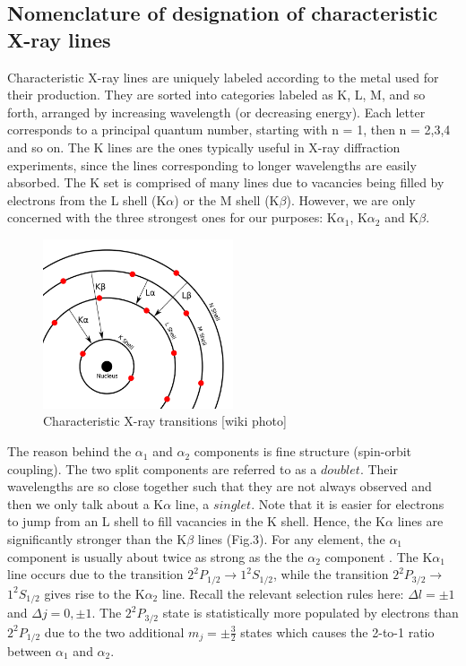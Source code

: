 \documentclass{article}
\begin{document}
\pagebreak{}

\subsection{Nomenclature of designation of characteristic X-ray lines}
Characteristic X-ray lines are uniquely labeled according to the metal used for their production. They are sorted into categories labeled as K, L, M, and so forth, arranged by increasing wavelength (or decreasing energy). Each letter corresponds to a principal quantum number, starting with n = 1, then n = 2,3,4 and so on. The K lines are the ones typically useful in X-ray diffraction experiments, since the lines corresponding to longer wavelengths are easily absorbed. The K set is comprised of many lines due to vacancies being filled by electrons from the L shell (K$\alpha$) or the M shell (K$\beta$). However, we are only concerned with the three strongest ones for our purposes: K$\alpha_1$, K$\alpha_2$ and K$\beta$. 

\begin{figure}[h]
    \centering
    \includegraphics[width=0.5\textwidth]{Figures/Screenshot 2024-06-02 204357.png}
    \caption{Characteristic X-ray transitions [wiki photo]}
    \label{fig:characteristicxraytransitions}
\end{figure}

The reason behind the $\alpha_1$ and $\alpha_2$ components is fine structure (spin-orbit coupling). The two split components are referred to as a $doublet$. Their wavelengths are so close together such that they are not always observed and then we only talk about a K$\alpha$ line, a $singlet$. Note that it is easier for electrons to jump from an L shell to fill vacancies in the K shell. Hence, the K$\alpha$ lines are significantly stronger than the K$\beta$ lines (Fig.3). For any element, the $\alpha_1$ component is usually about twice as strong as the the $\alpha_2$ component \cite{bernarddeniscullity_2015_elements}. The K$\alpha_1$ line occurs due to the transition $2^2 P_{1 / 2} \rightarrow 1^2 S_{1 / 2}$, while the transition $2^2 P_{3 / 2} \rightarrow$ $1^2 S_{1 / 2}$ gives rise to the K$\alpha_2$ line. Recall the relevant  selection rules here: $\Delta l = \pm1$ and $\Delta j = 0,\pm1$. The $2^2 P_{3 / 2}$ state is statistically more populated by electrons than $2^2 P_{1 / 2}$ due to the two additional $m_j = \pm\frac{3}{2}$ states which causes the 2-to-1 ratio between $\alpha_1$ and $\alpha_2$. 
\end{document}
